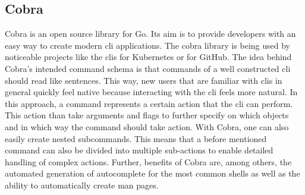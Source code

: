
\subsection{Cobra}
Cobra is an open source library for Go.
Its aim is to provide developers with an easy way to create modern \ac{cli} applications.
The cobra library is being used by noticeable projects like the \ac{cli}s for Kubernetes or for GitHub.
The idea behind Cobra's intended command schema is that commands of a well constructed \ac{cli} should read like sentences.
This way, new users that are familiar with \acp{cli} in general quickly feel native because interacting with the \ac{cli} feels more natural.
In this approach, a command represents a certain action that the \ac{cli} can perform.
This action than take arguments and flags to further specify on which objects and in which way the command should take action.
With Cobra, one can also easily create nested subcommands.
This means that a before mentioned command can also be divided into multiple sub-actions to enable detailed handling of complex actions.
Further, benefits of Cobra are, among others, the automated generation of autocomplete for the most common shells as well as the ability to automatically create man pages. \cite{cobra.github, cobra.dev}



